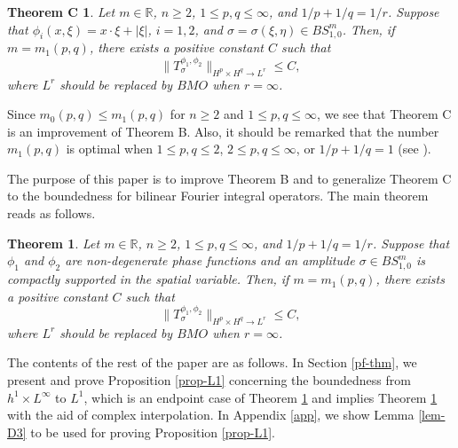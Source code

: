 \documentclass[12pt]{amsart}
\numberwithin{equation}{section}
\theoremstyle{plain}
\newtheorem{thm}{Theorem}[section]
\newtheorem*{referthmC}{Theorem C}
\theoremstyle{definition}
\newcommand{\R}{\mathbb{R}}
\begin{document}
\begin{referthmC}
Let $m \in \R$,
$n\ge 2$,  
$1\le p, q\le \infty$, and $1/p+1/q=1/r$.  
Suppose that
$\phi_{i} (x, \xi) = x \cdot \xi + |\xi|$,
$i=1,2$,
and
$\sigma = \sigma(\xi, \eta) \in BS^{m}_{1,0}$.
Then, 
if $m= m_1 (p, q)$,
there exists a positive constant $C$ such that
\[
\|T_{\sigma}^{\phi_1, \phi_2}\|_{H^p \times H^q \to L^r}
\le C,
\]  
where $L^r$ should be replaced by $BMO$ when $r=\infty$. 
\end{referthmC}

Since $m_0(p, q) \le m_1(p, q)$
for $n \ge 2$ and $1\le p, q \le \infty$,
we see that Theorem C is an improvement of Theorem B.
Also, it should be remarked that 
the number $m_1(p, q)$ is optimal
when $1 \le p, q \le 2$, $2\le p, q \le \infty$,
or $1/p+1/q=1$
(see \cite[Theorem 1.5]{KMT}).

The purpose of this paper is
to improve Theorem B and
to generalize Theorem C to
the boundedness for bilinear Fourier integral operators.
The main theorem reads as follows.

\begin{thm} \label{th-main}
Let $m \in \R$,
$n\ge 2$,  
$1\le p, q\le \infty$, and $1/p+1/q=1/r$.  
Suppose that 
$\phi_1$ and $\phi_2$ are non-degenerate phase functions
and an amplitude 
$\sigma \in BS^{m}_{1,0}$
is compactly supported in the spatial variable.
Then, if $m = m_{1}(p, q) $,
there exists a positive constant $C$ such that
\[
\|T_{\sigma}^{\phi_1, \phi_2}\|_{H^p \times H^q \to L^r}
\le C ,
\]
where $L^r$ should be replaced by $BMO$ when $r=\infty$. 
\end{thm}


The contents of the rest of the paper are as follows. 
In Section \ref{pf-thm}, 
we present and prove Proposition \ref{prop-L1}
concerning the boundedness
from $h^1 \times L^\infty$ to $L^1$,
which is an endpoint case of Theorem \ref{th-main}
and implies Theorem \ref{th-main} 
with the aid of complex interpolation.
In Appendix \ref{app},
we show Lemma \ref{lem-D3} 
to be used for proving Proposition \ref{prop-L1}.
\end{document}
